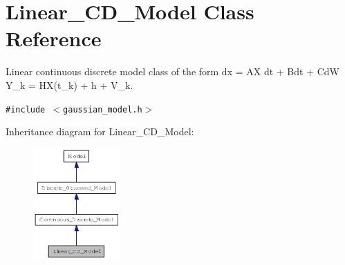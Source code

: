 \hypertarget{class_linear___c_d___model}{
\section{Linear\_\-CD\_\-Model Class Reference}
\label{class_linear___c_d___model}
}
Linear continuous discrete model class of the form dx = AX dt + Bdt + CdW Y\_\-k = HX(t\_\-k) + h + V\_\-k.  


{\tt \#include $<$gaussian\_\-model.h$>$}

Inheritance diagram for Linear\_\-CD\_\-Model:\nopagebreak
\begin{figure}[H]
\begin{center}
\leavevmode
\includegraphics[width=94pt]{class_linear___c_d___model__inherit__graph}
\end{center}
\end{figure}
